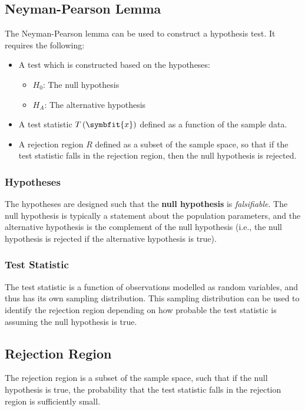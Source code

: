 \documentclass{article}
\begin{document}
\subsection{Neyman-Pearson Lemma}
The Neyman-Pearson lemma can be used to construct a hypothesis test. It requires the following:
\begin{itemize}
    \item A test which is constructed based on the hypotheses:
          \begin{itemize}
              \item \(H_0\): The null hypothesis
              \item \(H_A\): The alternative hypothesis
          \end{itemize}
    \item A test statistic \(T\left( \symbfit{x} \right)\) defined as a function of the sample data.
    \item A rejection region \(R\) defined as a subset of the sample space, so that if the test statistic
          falls in the rejection region, then the null hypothesis is rejected.
\end{itemize}
\subsubsection{Hypotheses}
The hypotheses are designed such that the \textbf{null hypothesis} is \textit{falsifiable}. The
null hypothesis is typically a statement about the population parameters, and the alternative
hypothesis is the complement of the null hypothesis (i.e., the null hypothesis is rejected if the alternative hypothesis is true).
\subsubsection{Test Statistic}
The test statistic is a function of observations modelled as random variables, and thus has its own sampling distribution.
This sampling distribution can be used to identify the rejection region depending on how probable the test statistic is
assuming the null hypothesis is true.
\subsection{Rejection Region}
The rejection region is a subset of the sample space, such that if the null hypothesis is true,
the probability that the test statistic falls in the rejection region is sufficiently small.
\end{document}
